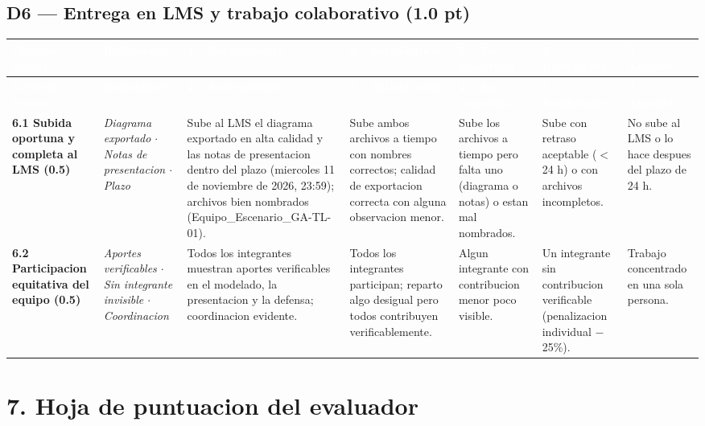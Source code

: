 \documentclass[10pt]{article}
\newcommand{\rubheader}{\rowcolor{uteqBlue}\textbf{\textcolor{white}{Criterio (peso)}} & \textbf{\textcolor{white}{Indicadores}} & \textbf{\textcolor{white}{4 -- Sobresaliente}} & \textbf{\textcolor{white}{3 -- Satisfactorio}} & \textbf{\textcolor{white}{2 -- En desarrollo}} & \textbf{\textcolor{white}{1 -- Insuficiente}} & \textbf{\textcolor{white}{0 -- Ausente}}\\\hline}
\begin{document}
\subsection{D6 --- Entrega en LMS y trabajo colaborativo (1.0 pt)}

\begin{xltabular}{\textwidth}{|>{\RaggedRight\small}p{2.7cm}|>{\RaggedRight\small}p{2.8cm}|>{\RaggedRight\small}X|>{\RaggedRight\small}X|>{\RaggedRight\small}X|>{\RaggedRight\small}X|>{\RaggedRight\small}X|}
	\hline
	\rubheader
	\endfirsthead
	\hline
	\rubheader
	\endhead
	\textbf{6.1 Subida oportuna y completa al LMS (0.5)} & \textit{Diagrama exportado $\cdot$ Notas de presentacion $\cdot$ Plazo} & Sube al LMS el diagrama exportado en alta calidad y las notas de presentacion dentro del plazo (miercoles 11 de noviembre de 2026, 23:59); archivos bien nombrados (Equipo\_Escenario\_GA-TL-01). & Sube ambos archivos a tiempo con nombres correctos; calidad de exportacion correcta con alguna observacion menor. & Sube los archivos a tiempo pero falta uno (diagrama o notas) o estan mal nombrados. & Sube con retraso aceptable ($<$ 24 h) o con archivos incompletos. & No sube al LMS o lo hace despues del plazo de 24 h.\\
	\hline
	\textbf{6.2 Participacion equitativa del equipo (0.5)} & \textit{Aportes verificables $\cdot$ Sin integrante invisible $\cdot$ Coordinacion} & Todos los integrantes muestran aportes verificables en el modelado, la presentacion y la defensa; coordinacion evidente. & Todos los integrantes participan; reparto algo desigual pero todos contribuyen verificablemente. & Algun integrante con contribucion menor poco visible. & Un integrante sin contribucion verificable (penalizacion individual $-$25\%). & Trabajo concentrado en una sola persona.\\
	\hline
\end{xltabular}

\section{7. Hoja de puntuacion del evaluador}
\end{document}
